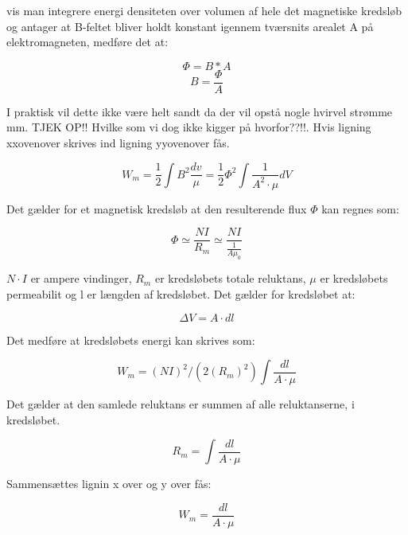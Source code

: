 vis man integrere energi densiteten over volumen af hele det magnetiske kredsløb og antager at B-feltet bliver holdt konstant igennem tværsnits arealet A på elektromagneten, medføre det at:

\begin{equation}
\Phi=B*A
\end{equation}
\begin{equation}
B=\frac{\Phi}{A}
\end{equation}


I praktisk vil dette ikke være helt sandt da der vil opstå nogle hvirvel strømme mm. TJEK OP!! Hvilke som vi dog ikke kigger på hvorfor??!!. Hvis ligning xxovenover skrives ind ligning yyovenover fås.

\begin{equation}
W_m = \frac{1}{2} \int B^2 \frac{dv}{\mu}  = \frac{1}{2} \Phi^2 \int \frac{1}{A^2 \cdot \mu} dV
\end{equation}

Det gælder for et magnetisk kredsløb at den resulterende flux $\Phi$ kan regnes som:

\begin{equation}
\Phi \simeq \frac{NI}{R_m} \simeq  \frac{NI}{\frac{1}{A\mu_0}}
\end{equation}

$N \cdot I$ er ampere vindinger, $R_m$ er kredsløbets totale reluktans, $ \mu $ er kredsløbets permeabilit og l er længden af kredsløbet. Det gælder for kredsløbet at:

\begin{equation}
\Delta V =A \cdot dl
\end{equation}

Det medføre at kredsløbets energi kan skrives som:

\begin{equation}
W_m = (NI)^2/(2(R_m)^2) \int \frac{dl}{A \cdot \mu}
\end{equation}

Det gælder at den samlede reluktans er summen af alle reluktanserne, i kredsløbet.

\begin{equation}
R_m = \int \frac{dl}{A \cdot \mu}
\end{equation}

Sammensættes lignin x over og y over fås:

\begin{equation}
W_m = \frac{dl}{A \cdot \mu}
\end{equation}

